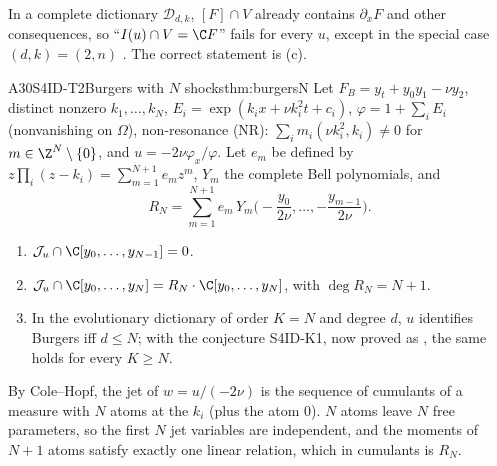 \begin{caution}[title={The literal statement is false}]
In a complete dictionary $\mathcal D_{d,k}$, $[F]\cap V$ already contains $\partial_xF$ and other consequences, so ``$I(u)\cap V=\C F$'' fails for every $u$, except in the special case $(d,k)=(2,n)$ . The correct statement is (c).
\end{caution}

\begin{dimcard}{A30}{S4ID-T2}{Burgers with $N$ shocks}{\proved}{thm:burgersN}
Let $F_B=y_t+y_0y_1-\nu y_2$, distinct nonzero $k_1,\dots,k_N$, $E_i=\exp(k_ix+\nu k_i^2t+c_i)$, $\varphi=1+\sum_iE_i$ (nonvanishing on $\Omega$), non-resonance (NR): $\sum_im_i(\nu k_i^2,k_i)\ne0$ for $m\in\Z^N\setminus\{0\}$, and $u=-2\nu\varphi_x/\varphi$. Let $e_m$ be defined by $z\prod_i(z-k_i)=\sum_{m=1}^{N+1}e_mz^m$, $Y_m$ the complete Bell polynomials, and
\[
R_N=\sum_{m=1}^{N+1}e_m\,Y_m\Big(-\frac{y_0}{2\nu},\dots,-\frac{y_{m-1}}{2\nu}\Big).
\]
\begin{enumerate}[label=(\alph*)]
\item $\mathcal J_u\cap\C[y_0,\dots,y_{N-1}]=0$.
\item $\mathcal J_u\cap\C[y_0,\dots,y_N]=R_N\cdot\C[y_0,\dots,y_N]$, with $\deg R_N=N+1$.
\item In the evolutionary dictionary of order $K=N$ and degree $d$, $u$ identifies Burgers iff $d\le N$; with the conjecture S4ID-K1, now proved as , the same holds for every $K\ge N$.
\end{enumerate}
\end{dimcard}

\begin{proofidea}
By Cole--Hopf, the jet of $w=u/(-2\nu)$ is the sequence of cumulants of a measure with $N$ atoms at the $k_i$ (plus the atom $0$). $N$ atoms leave $N$ free parameters, so the first $N$ jet variables are independent, and the moments of $N+1$ atoms satisfy exactly one linear relation, which in cumulants is $R_N$.
\end{proofidea}

